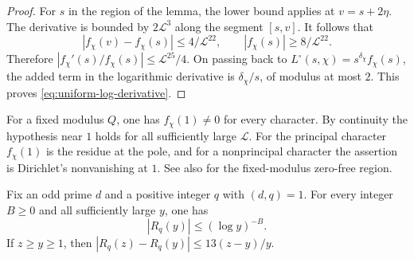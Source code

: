 \begin{proof}
For \(s\) in the region of the lemma, the lower bound applies at \(v=s+2\eta\).
The derivative is bounded by \(2\mathcal L^3\) along the segment \([s,v]\).
It follows that
\[
 |f_\chi(v)-f_\chi(s)|\le4/\mathcal L^{22},
 \qquad |f_\chi(s)|\ge8/\mathcal L^{22}.
\]
Therefore \(|f_\chi'(s)/f_\chi(s)|\le\mathcal L^{25}/4\).
On passing back to \(L^\circ(s,\chi)=s^{\delta_\chi}f_\chi(s)\), the added
term in the logarithmic derivative is \(\delta_\chi/s\), of modulus at
most \(2\). This proves \eqref{eq:uniform-log-derivative}.
\end{proof}

For a fixed modulus \(Q\), one has \(f_\chi(1)\ne0\) for every character.
By continuity the hypothesis near \(1\) holds for all sufficiently large
\(\mathcal L\). For the principal character \(f_\chi(1)\) is the residue at
the pole, and for a nonprincipal character the assertion is Dirichlet's
nonvanishing at \(1\). See also \cite[Chapter 11]{mv} for the fixed-modulus
zero-free region.

\begin{lemma}\label{lem:fixed-modulus-pnt}
Fix an odd prime \(d\) and a positive integer \(q\) with \((d,q)=1\).
For every integer \(B\ge0\) and all sufficiently large \(y\), one has
\[
 |R_q(y)|\le(\log y)^{-B}.
\]
If \(z\ge y\ge1\), then \(|R_q(z)-R_q(y)|\le13(z-y)/y\).
\end{lemma}

